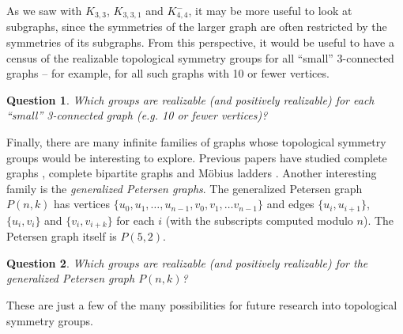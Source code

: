 \documentclass[11]{amsart}
\newtheorem{question}{Question}
\theoremstyle{definition}
\theoremstyle{remark}
\begin{document}
As we saw with $K_{3,3}$, $K_{3,3,1}$ and $K_{4,4}^-$, it may be more useful to look at subgraphs, since the symmetries of the larger graph are often restricted by the symmetries of its subgraphs.  From this perspective, it would be useful to have a census of the realizable topological symmetry groups for all ``small'' 3-connected graphs -- for example, for all such graphs with 10 or fewer vertices.

\begin{question}
Which groups are realizable (and positively realizable) for each ``small'' 3-connected graph (e.g. 10 or fewer vertices)?
\end{question}

Finally, there are many infinite families of graphs whose topological symmetry groups would be interesting to explore. Previous papers have studied complete graphs \cite{fmn3}, complete bipartite graphs \cite{hmp} and M\"{o}bius ladders \cite{fl}. Another interesting family is the {\em generalized Petersen graphs}. The generalized Petersen graph $P(n, k)$ has vertices $\{u_0, u_1, \dots, u_{n-1}, v_0, v_1, \dots v_{n-1}\}$ and edges $\{u_i, u_{i+1}\}$, $\{u_i, v_i\}$ and $\{v_i, v_{i+k}\}$ for each $i$ (with the subscripts computed modulo $n$). The Petersen graph itself is $P(5,2)$.

\begin{question}
Which groups are realizable (and positively realizable) for the generalized Petersen graph $P(n,k)$?
\end{question}

These are just a few of the many possibilities for future research into topological symmetry groups.

\end{document}
